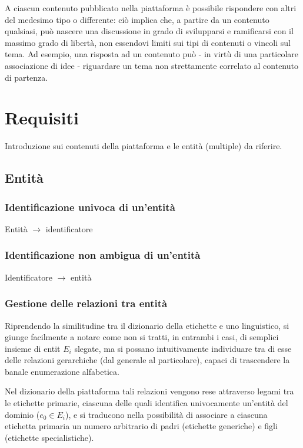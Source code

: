 \documentclass[10pt,a4paper,headinclude,footinclude,hidelinks]{scrreprt} %
\begin{document}
	A ciascun contenuto pubblicato nella piattaforma è possibile rispondere con altri del medesimo tipo o differente: ciò implica che, a partire da un contenuto qualsiasi, può nascere una discussione in grado di svilupparsi e ramificarsi con il massimo grado di libertà, non essendovi limiti sui tipi di contenuti o vincoli sul tema. Ad esempio, una risposta ad un contenuto può - in virtù di una particolare associazione di idee - riguardare un tema non strettamente correlato al contenuto di partenza.
	

	\chapter{Requisiti}
	\label{ch:stage:req}

	Introduzione sui contenuti della piattaforma e le entità (multiple) da riferire.

	\section{Entit\`a}
	\label{sec:stage:req:entità}
	\subsection{Identificazione univoca di un'entit\`a}
	Entità $\to$ identificatore
	\subsection{Identificazione non ambigua di un'entit\`a}
	Identificatore $\to$ entità
	\subsection{Gestione delle relazioni tra entit\`a}

	Riprendendo la similitudine tra il dizionario della etichette e uno linguistico, si giunge facilmente a notare come non si tratti, in entrambi i casi, di semplici insieme di entit $E_i$ slegate, ma si possano intuitivamente individuare tra di esse delle relazioni gerarchiche (dal generale al particolare), capaci di trascendere la banale enumerazione alfabetica.

	Nel dizionario della piattaforma tali relazioni vengono rese attraverso legami tra le etichette primarie, ciascuna delle quali identifica univocamente un'entità del dominio ($e_0 \in E_i$), e si traducono nella possibilità di associare a ciascuna etichetta primaria un numero arbitrario di padri (etichette generiche) e figli (etichette specialistiche).
\end{document}
